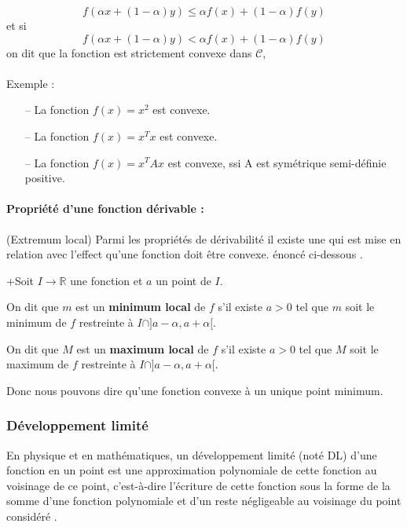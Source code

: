 				
		\begin{equation}
			f(\alpha x + (1 - \alpha)y) \leq \alpha f(x) + (1 - \alpha)f(y)
			\label{eq_convexe-1}
		\end{equation}
		et si
		\begin{equation}
			f(\alpha x + (1 - \alpha)y) < \alpha f(x) + (1 - \alpha)f(y)
			\label{eq_convexe-2}
		\end{equation}
		on dit que la fonction est strictement convexe dans $\mathcal{C}$,  \cite[voir dans][page:45]{jtshiman:2021}\\\\
		Exemple \cite{jtshiman:2021}: 
		\begin{itemize}
			\item[--] La fonction $ f(x) = x^2$ est convexe. 
			\item[--] La fonction $ f(x) = x^T x$ est convexe.
			\item[--] La fonction $ f(x) = x^T Ax$ est convexe, ssi A est symétrique semi-définie positive.
		\end{itemize}
	
		\paragraph*{Propriété d'une fonction dérivable : } (Extremum local) 
		Parmi les propriétés de dérivabilité il existe une qui est mise en relation avec l'effect qu'une fonction doit être convexe. énoncé ci-dessous \cite[voir dans][page:212]{coulombeau2013math}.\\
		\begin{list}{+}{Soit $I \rightarrow  \mathbb{R} $ une fonction et $a$ un point de $I$.}
			\item  {On dit que $m$ est un \textbf{minimum local} de $f$ s'il existe $a > 0$ tel que $m$ soit le minimum de $f$ restreinte à $I \cap ] a-\alpha, a + \alpha [$. }
			\item On dit que $M$ est un \textbf{maximum local} de $f$ s'il existe $a > 0$ tel que $M$ soit le maximum de $f$ restreinte à $I \cap ] a-\alpha, a + \alpha [$. 
		\end{list} 
		
		Donc nous pouvons dire qu'une fonction convexe à un unique point minimum.
		
		 
		\subsubsection{Développement limité}\label{sec:dev_lim}
		En physique et en mathématiques, un développement limité (noté DL) d'une fonction en un point est une approximation polynomiale de cette fonction au voisinage de ce point, c'est-à-dire l'écriture de cette fonction sous la forme de la somme d'une fonction polynomiale et d'un reste négligeable au voisinage du point considéré \cite{coulombeau2013math}.
		
